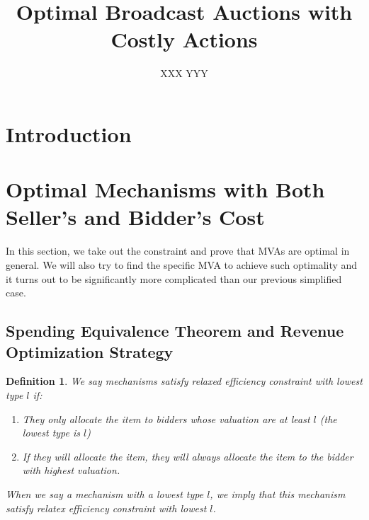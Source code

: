\documentclass{aamas2012}
\newtheorem{definition}{Definition}
\begin{document}
\title{Optimal Broadcast Auctions with Costly Actions}


\author{ \alignauthor XXX \alignauthor YYY }


\maketitle

\section{Introduction}





\section{Optimal Mechanisms with Both Seller's and Bidder's Cost}

In this section, we take out the constraint and prove that MVAs are optimal in
general. We will also try to find the specific MVA to achieve such optimality
and it turns out to be significantly more complicated than our previous
simplified case.

\subsection{Spending Equivalence Theorem and Revenue Optimization Strategy}

\begin{definition}

We say mechanisms satisfy relaxed efficiency constraint with lowest type $l$
if:

    \begin{enumerate}

    \item They only allocate the item to bidders whose valuation are at least
    $l$ (the lowest type is $l$)

    \item If they will allocate the item, they will always allocate the item to
    the bidder with highest valuation.

    \end{enumerate}

When we say a mechanism with a lowest type $l$, we imply that this mechanism
satisfy relatex efficiency constraint with lowest $l$.

\end{definition}
\end{document}
